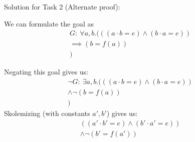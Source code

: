 \documentclass[12pt,letterpaper, onecolumn]{exam}
\begin{document}
\begin{questions}
	Solution for Task 2 (Alternate proof):

	We can formulate the goal as 
	\begin{align*}
		G : \: \forall a, b . (((a \cdot b = e) \land (b \cdot a = e))  \\ \implies (b = f(a))  \\ )
	\end{align*}
	
	Negating this goal gives us:
	\begin{align*}
		\neg G : \: \exists a, b . (((a \cdot b = e) \land (b \cdot a = e))  \\ \land \neg(b = f(a))  \\)
	\end{align*}
	Skolemizing (with constants $a', b'$) gives us:
	\begin{align*}
		((a' \cdot b' = e) \land (b' \cdot a' = e))  \\ \land \neg(b' = f(a'))  \\
	\end{align*}


\end{questions}
\end{document}
